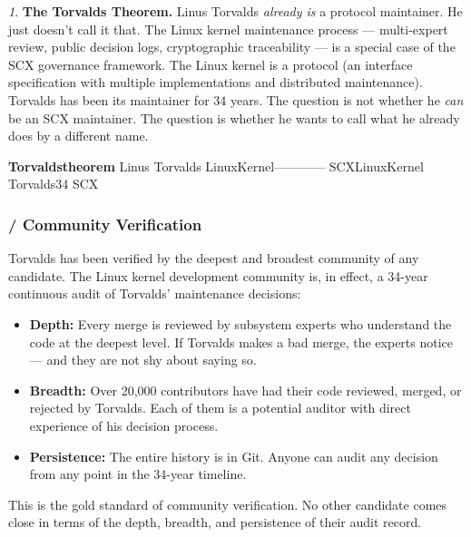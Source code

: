 \documentclass[12pt,a4paper]{article}
\theoremstyle{remark}
\newtheorem{govinsight}{}[section]
\newenvironment{govbox}{%
  \begin{center}
  \color{insightblue}
  \begin{minipage}{0.92\textwidth}
  \begin{govinsight}
}{%
  \end{govinsight}
  \end{minipage}
  \end{center}
}
\begin{document}
\begin{govbox}
\textbf{The Torvalds Theorem.}
Linus Torvalds \textit{already is} a protocol maintainer. He just doesn't
call it that. The Linux kernel maintenance process — multi-expert review,
public decision logs, cryptographic traceability — is a special case of the
SCX governance framework. The Linux kernel is a protocol (an interface
specification with multiple implementations and distributed maintenance).
Torvalds has been its maintainer for 34 years. The question is not whether
he \textit{can} be an SCX maintainer. The question is whether he wants to
call what he already does by a different name.

\textbf{Torvaldstheorem}
Linus Torvalds \textit{}
LinuxKernel————
SCXLinuxKernel
Torvalds34\textit{}
SCX
\end{govbox}

\subsubsection{ / Community Verification}

Torvalds has been verified by the deepest and broadest community of any
candidate. The Linux kernel development community is, in effect, a
34-year continuous audit of Torvalds' maintenance decisions:

\begin{itemize}[leftmargin=*]
    \item \textbf{Depth:} Every merge is reviewed by subsystem experts who
          understand the code at the deepest level. If Torvalds makes a bad
          merge, the experts notice — and they are not shy about saying so.
    \item \textbf{Breadth:} Over 20,000 contributors have had their code
          reviewed, merged, or rejected by Torvalds. Each of them is a
          potential auditor with direct experience of his decision process.
    \item \textbf{Persistence:} The entire history is in Git. Anyone can
          audit any decision from any point in the 34-year timeline.
\end{itemize}

This is the gold standard of community verification. No other candidate
comes close in terms of the depth, breadth, and persistence of their
audit record.
\end{document}

